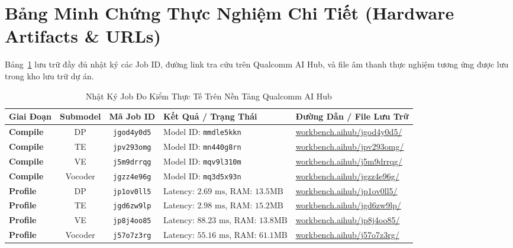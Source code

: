 \documentclass[11pt,a4paper,oneside,table]{report}
\begin{document}
\section{Bảng Minh Chứng Thực Nghiệm Chi Tiết (Hardware Artifacts \& URLs)}
Bảng~\ref{tab:official_job_registry} lưu trữ đầy đủ nhật ký các Job ID, đường link tra cứu trên Qualcomm AI Hub, và file âm thanh thực nghiệm tương ứng được lưu trong kho lưu trữ dự án.

\begin{table}[H]
\centering
\small
\sffamily
\caption{Nhật Ký Job Đo Kiểm Thực Tế Trên Nền Tảng Qualcomm AI Hub}
\label{tab:official_job_registry}
\vspace{2mm}
\begin{tabularx}{\textwidth}{l c c p{3.2cm} p{4.2cm}}
\toprule
\textbf{Giai Đoạn} & \textbf{Submodel} & \textbf{Mã Job ID} & \textbf{Kết Quả / Trạng Thái} & \textbf{Đường Dẫn / File Lưu Trữ} \\
\midrule
\textbf{Compile} & DP & \texttt{jgod4y0d5} & Model ID: \texttt{mmdle5kkn} & \href{https://workbench.aihub.qualcomm.com/jobs/jgod4y0d5/}{workbench.aihub/jgod4y0d5/} \\
\textbf{Compile} & TE & \texttt{jpv293omg} & Model ID: \texttt{mn440g8rn} & \href{https://workbench.aihub.qualcomm.com/jobs/jpv293omg/}{workbench.aihub/jpv293omg/} \\
\textbf{Compile} & VE & \texttt{j5m9drrqg} & Model ID: \texttt{mqv9l310m} & \href{https://workbench.aihub.qualcomm.com/jobs/j5m9drrqg/}{workbench.aihub/j5m9drrqg/} \\
\textbf{Compile} & Vocoder & \texttt{jgzz4e96g} & Model ID: \texttt{mq3d5x93n} & \href{https://workbench.aihub.qualcomm.com/jobs/jgzz4e96g/}{workbench.aihub/jgzz4e96g/} \\
\addlinespace
\textbf{Profile} & DP & \texttt{jp1ov0ll5} & Latency: $2.69\text{ ms}$, RAM: $13.5\text{MB}$ & \href{https://workbench.aihub.qualcomm.com/jobs/jp1ov0ll5/}{workbench.aihub/jp1ov0ll5/} \\
\textbf{Profile} & TE & \texttt{jgd6zw9lp} & Latency: $2.98\text{ ms}$, RAM: $15.2\text{MB}$ & \href{https://workbench.aihub.qualcomm.com/jobs/jgd6zw9lp/}{workbench.aihub/jgd6zw9lp/} \\
\textbf{Profile} & VE & \texttt{jp8j4oo85} & Latency: $88.23\text{ ms}$, RAM: $13.8\text{MB}$ & \href{https://workbench.aihub.qualcomm.com/jobs/jp8j4oo85/}{workbench.aihub/jp8j4oo85/} \\
\textbf{Profile} & Vocoder & \texttt{j57o7z3rg} & Latency: $55.16\text{ ms}$, RAM: $61.1\text{MB}$ & \href{https://workbench.aihub.qualcomm.com/jobs/j57o7z3rg/}{workbench.aihub/j57o7z3rg/} \\

\end{tabularx}
\end{table}
\end{document}
